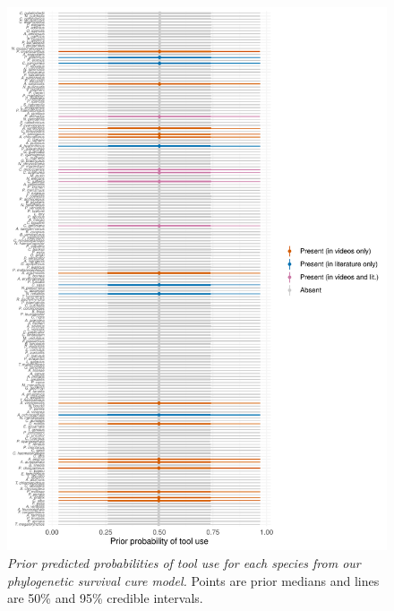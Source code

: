 \documentclass[
  man,floatsintext]{apa6}
\begin{document}
\begin{figure}
\centering
\includegraphics{manuscript_files/figure-latex/plotSurvCure7-1.pdf}
\caption{\label{fig:plotSurvCure7}\emph{Prior predicted probabilities of tool use for each species from our phylogenetic survival cure model.} Points are prior medians and lines are 50\% and 95\% credible intervals.}
\end{figure}

\newpage
\end{document}
